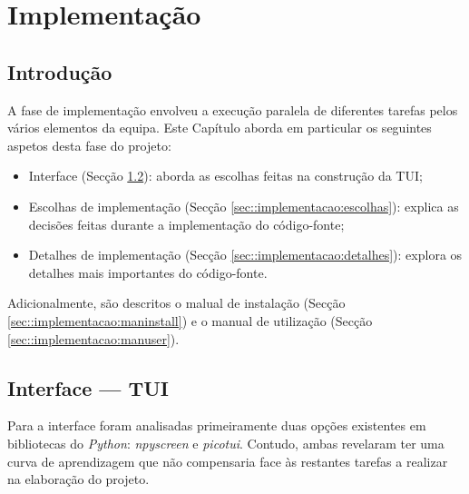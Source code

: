 \chapter{Implementação}
\label{ch::implementacao}

\section{Introdução}
\label{sec::implementacao:intro}

A fase de implementação envolveu a execução paralela de diferentes tarefas pelos vários elementos da equipa. Este Capítulo aborda em particular os seguintes aspetos desta fase do projeto:

\begin{itemize}
    \item Interface (Secção \ref{sec::implementacao:tui}): aborda as escolhas feitas na construção da \acf{TUI};
    \item Escolhas de implementação (Secção \ref{sec::implementacao:escolhas}): explica as decisões feitas durante a implementação do código-fonte;
    \item Detalhes de implementação (Secção \ref{sec::implementacao:detalhes}): explora os detalhes mais importantes do código-fonte.
\end{itemize}

Adicionalmente, são descritos o malual de instalação (Secção \ref{sec::implementacao:maninstall}) e o manual de utilização (Secção \ref{sec::implementacao:manuser}).


\section{Interface --- \ac{TUI}}
\label{sec::implementacao:tui}

Para a interface foram analisadas primeiramente duas opções existentes em bibliotecas do \textit{Python}: \textit{npyscreen} e \textit{picotui}. Contudo, ambas revelaram ter uma curva de aprendizagem que não compensaria face às restantes tarefas a realizar na elaboração do projeto.

